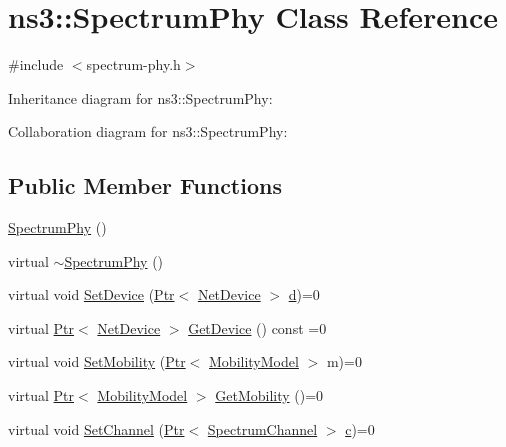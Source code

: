 \hypertarget{classns3_1_1SpectrumPhy}{}\section{ns3\+:\+:Spectrum\+Phy Class Reference}
\label{classns3_1_1SpectrumPhy}


{\ttfamily \#include $<$spectrum-\/phy.\+h$>$}



Inheritance diagram for ns3\+:\+:Spectrum\+Phy\+:


Collaboration diagram for ns3\+:\+:Spectrum\+Phy\+:
\subsection*{Public Member Functions}
\begin{DoxyCompactItemize}
\item 
\hyperlink{classns3_1_1SpectrumPhy_a207bd7373a9fd3b7f8d8e00380a0e7e4}{Spectrum\+Phy} ()
\item 
virtual \hyperlink{classns3_1_1SpectrumPhy_a8a0246b29e630af5778f1a070ecc5031}{$\sim$\+Spectrum\+Phy} ()
\item 
virtual void \hyperlink{classns3_1_1SpectrumPhy_ae3efea78dda6746fc5c2ddcf55912354}{Set\+Device} (\hyperlink{classns3_1_1Ptr}{Ptr}$<$ \hyperlink{classns3_1_1NetDevice}{Net\+Device} $>$ \hyperlink{lte__pathloss_8m_a1aabac6d068eef6a7bad3fdf50a05cc8}{d})=0
\item 
virtual \hyperlink{classns3_1_1Ptr}{Ptr}$<$ \hyperlink{classns3_1_1NetDevice}{Net\+Device} $>$ \hyperlink{classns3_1_1SpectrumPhy_affe750ac922318000fef95dfbfb359fd}{Get\+Device} () const =0
\item 
virtual void \hyperlink{classns3_1_1SpectrumPhy_a0cec4d706f616b28614e76e5454822bb}{Set\+Mobility} (\hyperlink{classns3_1_1Ptr}{Ptr}$<$ \hyperlink{classns3_1_1MobilityModel}{Mobility\+Model} $>$ m)=0
\item 
virtual \hyperlink{classns3_1_1Ptr}{Ptr}$<$ \hyperlink{classns3_1_1MobilityModel}{Mobility\+Model} $>$ \hyperlink{classns3_1_1SpectrumPhy_a807f03c6444826ee9857813eaffcc5e2}{Get\+Mobility} ()=0
\item 
virtual void \hyperlink{classns3_1_1SpectrumPhy_a951c373dd0cd6911c6f84bb65b5914b9}{Set\+Channel} (\hyperlink{classns3_1_1Ptr}{Ptr}$<$ \hyperlink{classns3_1_1SpectrumChannel}{Spectrum\+Channel} $>$ \hyperlink{mmwave_2model_2fading-traces_2fading__trace__generator_8m_ae0323a9039add2978bf5b49550572c7c}{c})=0
\item 

\end{DoxyCompactItemize}
